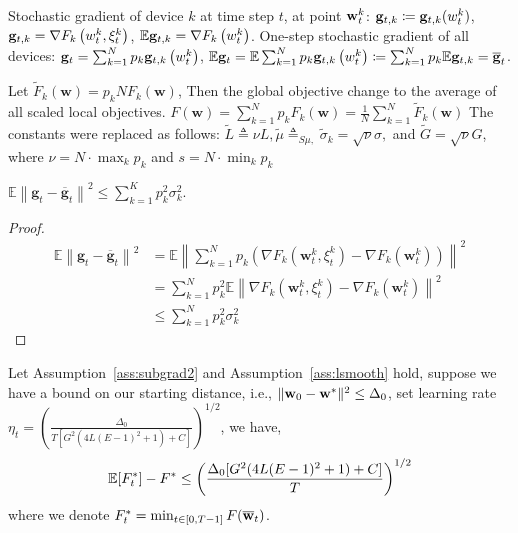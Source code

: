 
Stochastic gradient of device $k$ at time step $t$, at point ${\mathbf{w}}_t^k$: 
	${\mathbf{g}}_{t,k} \coloneqq {\mathbf{g}}_{t,k}(w_t^k)$,
	$ {\mathbf{g}}_{t, k} = {\nabla} F_{k}\left(w_{t}^{k}, \xi_{t}^{k}\right) $,
	$\mathbb{E} {\mathbf{g}}_{t, k} = {\nabla} F_{k}\left(w_{t}^{k}\right)$.
One-step stochastic gradient of all devices:
${\mathbf{g}}_{t}=\sum_{k=1}^{N} p_{k} {\mathbf{g}}_{t, k}\left(w_{t}^{k}\right) $, $\mathbb{E} {\mathbf{g}}_{t}= \mathbb{E} \sum_{k=1}^{N} p_{k} {\mathbf{g}}_{t, k}\left(w_{t}^{k}\right) \coloneqq \sum_{k=1}^{N} p_{k} \mathbb{E} {\mathbf{g}}_{t, k} = {\overline{\mathbf{g}}}_t$.

Let $\widetilde{F}_{k}(\mathbf{w})=p_{k} N F_{k}(\mathbf{w})$, Then the global objective change to the 
average of all scaled local objectives. 
$F(\mathbf{w})=\sum_{k=1}^{N} p_{k} F_{k}(\mathbf{w})=\frac{1}{N} \sum_{k=1}^{N} \widetilde{F}_{k}(\mathbf{w})$
The constants were replaced as follows:
$\widetilde{L} \triangleq \nu L, \widetilde{\mu} \triangleq_{S \mu,} \widetilde{\sigma}_{k}=\sqrt{\nu} \sigma,$ and $\widetilde{G}=\sqrt{\nu} G$, where $\nu=N \cdot \max _{k} p_{k}$ and $s=N \cdot \min _{k} p_{k}$

\begin{lemma}
$\mathbb{E}\left\|\mathbf{g}_{t}-\overline{\mathbf{g}}_{t}\right\|^{2}  \leq \sum_{k=1}^K p_k^2\sigma_k^2$.
\end{lemma}

\begin{proof}
	\begin{align*}
		\mathbb{E}\left\|\mathbf{g}_{t}-\overline{\mathbf{g}}_{t}\right\|^{2} 
		&=\mathbb{E}\left\|\sum_{k=1}^{N} p_{k}\left(\nabla F_{k}\left(\mathbf{w}_{t}^{k}, \xi_{t}^{k}\right)-\nabla F_{k}\left(\mathbf{w}_{t}^{k}\right)\right)\right\|^{2} \\ 
		&=\sum_{k=1}^{N} p_{k}^{2} \mathbb{E}\left\|\nabla F_{k}\left(\mathbf{w}_{t}^{k}, \xi_{t}^{k}\right)-\nabla F_{k}\left(\mathbf{w}_{t}^{k}\right)\right\|^{2} \\ 
		& \leq \sum_{k=1}^{N} p_{k}^{2} \sigma_{k}^{2} 
	\end{align*}
\end{proof}


\begin{theorem}
Let Assumption~\ref{ass:subgrad2} and Assumption~\ref{ass:lsmooth} hold, suppose we have a bound 
on our starting distance, i.e., $\|{\mathbf{w}}_{0} - {\mathbf{w}}^*\|^2 \leq \Delta_0$, set learning rate $\eta_t =  \left(\frac{\Delta_0}{ T [G^2( 4L(E-1)^2 + 1) + C]}\right)^{1/2}$, we have,
$$\mathbb{E}[ F_t^*] - F^*  \leq \left(\frac{ \Delta_0 [G^2( 4L(E-1)^2 + 1) + C] }{T}\right)^{1/2}$$
where we denote $F^*_t = \min_{t \in [0, T-1]} F({\overline{\mathbf{w}}}_t)$.
\end{theorem}


